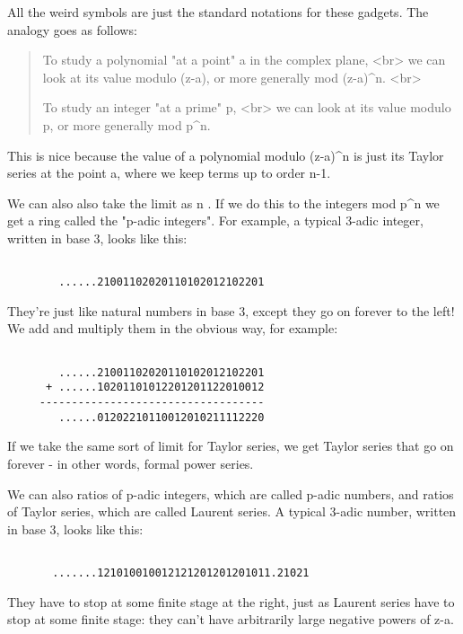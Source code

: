 All the weird symbols are just the standard notations for these gadgets.
The analogy goes as follows:

\begin{quote}
   To study a polynomial "at a point" a in the complex plane, <br>
   we can look at its value modulo (z-a),  
   or more generally mod (z-a)^{n}. <br>
   
   To study an integer "at a prime" p, <br>
   we can look at its value modulo p, 
  or more generally mod p^{n}.
\end{quote}

This is nice because the value of a polynomial modulo
(z-a)^{n} is just its Taylor series at the point a, where we
keep terms up to order n-1.

We can also also take the limit as n \to  \infty .  If we do this to
the integers mod p^{n} we get a ring called the "p-adic
integers".  For example, a typical 3-adic integer, written in
base 3, looks like this:


\begin{verbatim}

        ......21001102020110102012102201
\end{verbatim}
    
They're just like natural numbers in base 3, except they go on forever to the
left!  We add and multiply them in the obvious way, for example:


\begin{verbatim}

        ......21001102020110102012102201
      + ......10201101012201201122010012
     -----------------------------------
        ......01202210110012010211112220
\end{verbatim}
    
If we take the same sort of limit for Taylor series, we get Taylor series 
that go on forever - in other words, formal power series.  

We can also ratios of p-adic integers, which are called p-adic numbers,
and ratios of Taylor series, which are called Laurent series.   A typical
3-adic number, written in base 3, looks like this:


\begin{verbatim}

       .......121010010012121201201201011.21021
\end{verbatim}
    
They have to stop at some finite stage at the right, just as Laurent
series have to stop at some finite stage: they can't have arbitrarily
large negative powers of z-a.  
                     
